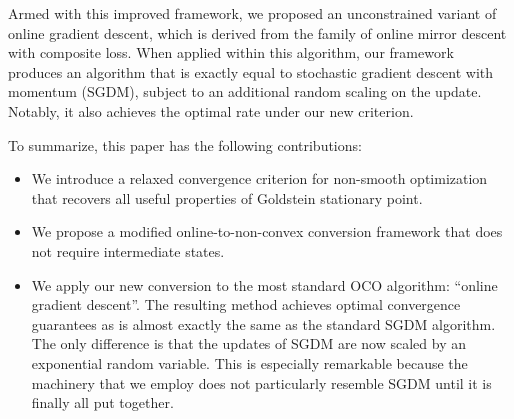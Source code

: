 Armed  with this improved framework, we proposed an unconstrained variant of online gradient descent, which is derived from the family of online mirror descent with composite loss. When applied within this algorithm, our framework produces an algorithm that is exactly equal to stochastic gradient descent with momentum (SGDM), subject to an additional random scaling on the update. Notably, it also achieves the optimal rate under our new criterion.

To summarize, this paper has the following contributions:
\begin{itemize}
    \item We introduce a relaxed convergence criterion for non-smooth optimization that recovers all useful properties of Goldstein stationary point.

    \item We propose a modified online-to-non-convex conversion framework that does not require intermediate states.

    \item We apply our new conversion to the most standard OCO algorithm: ``online gradient descent''. The resulting method achieves optimal convergence guarantees as is almost exactly the same as the standard SGDM algorithm. The only difference is that the updates of  SGDM are now scaled by an exponential random variable. This is especially remarkable because the machinery that we employ does not particularly resemble SGDM until it is finally all put together.
    

\end{itemize}